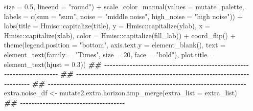 \documentclass[
]{article}
\newenvironment{Shaded}{\begin{snugshade}}{\end{snugshade}}
\newcommand{\AttributeTok}[1]{\textcolor[rgb]{0.77,0.63,0.00}{#1}}
\newcommand{\DecValTok}[1]{\textcolor[rgb]{0.00,0.00,0.81}{#1}}
\newcommand{\DocumentationTok}[1]{\textcolor[rgb]{0.56,0.35,0.01}{\textbf{\textit{#1}}}}
\newcommand{\FloatTok}[1]{\textcolor[rgb]{0.00,0.00,0.81}{#1}}
\newcommand{\FunctionTok}[1]{\textcolor[rgb]{0.00,0.00,0.00}{#1}}
\newcommand{\NormalTok}[1]{#1}
\newcommand{\OtherTok}[1]{\textcolor[rgb]{0.56,0.35,0.01}{#1}}
\newcommand{\SpecialCharTok}[1]{\textcolor[rgb]{0.00,0.00,0.00}{#1}}
\newcommand{\StringTok}[1]{\textcolor[rgb]{0.31,0.60,0.02}{#1}}
\begin{document}
\begin{Shaded}
\begin{Highlighting}[]
                   \AttributeTok{size =} \FloatTok{0.5}\NormalTok{, }\AttributeTok{lineend =} \StringTok{"round"}\NormalTok{) }\SpecialCharTok{+}
      \FunctionTok{scale\_color\_manual}\NormalTok{(}\AttributeTok{values =}\NormalTok{ mutate\_palette,}
                         \AttributeTok{labels =} \FunctionTok{c}\NormalTok{(}\AttributeTok{sum =} \StringTok{"sum"}\NormalTok{, }\AttributeTok{noise =} \StringTok{"middle noise"}\NormalTok{, }\AttributeTok{high\_noise =} \StringTok{"high noise"}\NormalTok{)) }\SpecialCharTok{+}
      \FunctionTok{labs}\NormalTok{(}\AttributeTok{title =}\NormalTok{ Hmisc}\SpecialCharTok{::}\FunctionTok{capitalize}\NormalTok{(title),}
           \AttributeTok{y =}\NormalTok{ Hmisc}\SpecialCharTok{::}\FunctionTok{capitalize}\NormalTok{(ylab),}
           \AttributeTok{x =}\NormalTok{ Hmisc}\SpecialCharTok{::}\FunctionTok{capitalize}\NormalTok{(xlab),}
           \AttributeTok{color =}\NormalTok{ Hmisc}\SpecialCharTok{::}\FunctionTok{capitalize}\NormalTok{(fill\_lab)) }\SpecialCharTok{+}
      \FunctionTok{coord\_flip}\NormalTok{() }\SpecialCharTok{+}
      \FunctionTok{theme}\NormalTok{(}\AttributeTok{legend.position =} \StringTok{"bottom"}\NormalTok{,}
            \AttributeTok{axis.text.y =} \FunctionTok{element\_blank}\NormalTok{(),}
            \AttributeTok{text =} \FunctionTok{element\_text}\NormalTok{(}\AttributeTok{family =} \StringTok{"Times"}\NormalTok{, }\AttributeTok{size =} \DecValTok{20}\NormalTok{, }\AttributeTok{face =} \StringTok{"bold"}\NormalTok{),}
            \AttributeTok{plot.title =} \FunctionTok{element\_text}\NormalTok{(}\AttributeTok{hjust =} \FloatTok{0.3}\NormalTok{))}
    \DocumentationTok{\#\# {-}{-}{-}{-}{-}{-}{-}{-}{-}{-}{-}{-}{-}{-}{-}{-}{-}{-}{-}{-}{-}{-}{-}{-}{-}{-}{-}{-}{-}{-}{-}{-}{-}{-}{-}{-}{-}{-}{-}{-}{-}{-}{-}{-}{-}{-}{-}{-}{-}{-}{-}{-}{-}{-}{-}{-}{-}{-}{-}{-}{-}{-}{-}{-}{-}{-}{-}{-}{-}{-} }
    \DocumentationTok{\#\# {-}{-}{-}{-}{-}{-}{-}{-}{-}{-}{-}{-}{-}{-}{-}{-}{-}{-}{-}{-}{-}{-}{-}{-}{-}{-}{-}{-}{-}{-}{-}{-}{-}{-}{-}{-}{-}{-}{-}{-}{-}{-}{-}{-}{-}{-}{-}{-}{-}{-}{-}{-}{-}{-}{-}{-}{-}{-}{-}{-}{-}{-}{-}{-}{-}{-}{-}{-}{-}{-} }
    \DocumentationTok{\#\# {-}{-}{-}{-}{-}{-}{-}{-}{-}{-}{-}{-}{-}{-}{-}{-}{-}{-}{-}{-}{-}{-}{-}{-}{-}{-}{-}{-}{-}{-}{-}{-}{-}{-}{-}{-}{-}{-}{-}{-}{-}{-}{-}{-}{-}{-}{-}{-}{-}{-}{-}{-}{-}{-}{-}{-}{-}{-}{-}{-}{-}{-}{-}{-}{-}{-}{-}{-}{-}{-} }
\NormalTok{    extra.noise\_df }\OtherTok{\textless{}{-}} \FunctionTok{mutate2.extra.horizon.tmp\_merge}\NormalTok{(}\AttributeTok{extra\_list =}\NormalTok{ extra\_list)}
    \DocumentationTok{\#\# {-}{-}{-}{-}{-}{-}{-}{-}{-}{-}{-}{-}{-}{-}{-}{-}{-}{-}{-}{-}{-}{-}{-}{-}{-}{-}{-}{-}{-}{-}{-}{-}{-}{-}{-}{-}{-} }

\end{Highlighting}
\end{Shaded}
\end{document}
